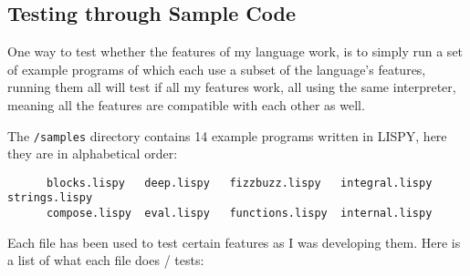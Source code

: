 \documentclass{article}
\newcommand{\code}[1]{\texttt{#1}}
\begin{document}
  \subsection{Testing through Sample Code}
    One way to test whether the features of my language work, is to simply
    run a set of example programs of which each use a subset of the language's
    features, running them all will test if all my features work, all using the
    same interpreter, meaning all the features are compatible with each other
    as well.

    The \code{/samples} directory contains 14 example programs written
    in LISPY, here they are in alphabetical order:
    \begin{Verbatim}
      blocks.lispy   deep.lispy	  fizzbuzz.lispy   integral.lispy  strings.lispy
      compose.lispy  eval.lispy	  functions.lispy  internal.lispy
    \end{Verbatim}

    Each file has been used to test certain features as I was developing them.
    Here is a list of what each file does / tests:
\end{document}
